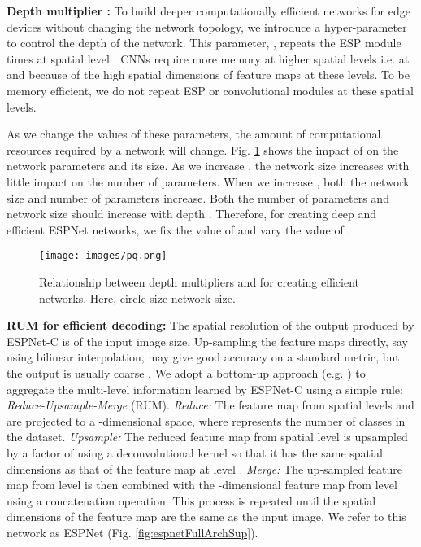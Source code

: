 \documentclass[runningheads]{llncs}
\def\Fig{Fig. }
\begin{document}
\noindent \textbf{Depth multiplier :} To build deeper computationally efficient networks for edge devices without changing the network topology, we introduce a hyper-parameter  to control the depth of the network. This parameter, , repeats the ESP module  times at spatial level . CNNs require more memory at higher spatial levels i.e. at  and  because of the high spatial dimensions of feature maps at these levels. To be memory efficient, we do not repeat ESP or convolutional modules at these spatial levels.

As we change the values of these parameters, the amount of computational resources required by a network will change. \Fig \ref{fig:resourceReqSup} shows the impact of   on the network parameters and its size. As we increase , the network size increases with little impact on the number of parameters. When we increase , both the network size and number of parameters increase. Both the number of parameters and network size should increase with depth \cite{he2016deep,xie2017aggregated,SzegedyIV16InceptionV4}. Therefore, for creating deep and efficient ESPNet networks, we fix the value of  and vary the value of .

\begin{figure}[t!]
\centering
\texttt{[image: images/pq.png]}
\caption{Relationship between depth multipliers  and  for creating efficient networks. Here, circle size  network size.}
\label{fig:resourceReqSup}
\end{figure}

\noindent \textbf{RUM for efficient decoding:} The spatial resolution of the output produced by ESPNet-C is  of the input image size. Up-sampling the feature maps directly, say using bilinear interpolation, may give good accuracy  on a standard metric, but the output is usually coarse \cite{long2015fully}. We adopt a bottom-up approach (e.g. \cite{badrinarayanan2017segnet,ronneberger2015u}) to aggregate the multi-level information learned by ESPNet-C using a simple rule: \textit{Reduce-Upsample-Merge} (RUM). \textit{Reduce:} The feature map from spatial levels  and  are projected to a -dimensional space, where  represents the number of classes in the dataset. \textit{Upsample:} The reduced feature map from spatial level  is upsampled by a factor of  using a  deconvolutional kernel so that it has the same spatial dimensions as that of the feature map at level . \textit{Merge:} The up-sampled feature map from level  is then combined with the -dimensional feature map from level  using a concatenation operation. This process is repeated until the spatial dimensions of the feature map are the same as the input image. We refer to this network as ESPNet (\Fig \ref{fig:espnetFullArchSup}).
\end{document}
